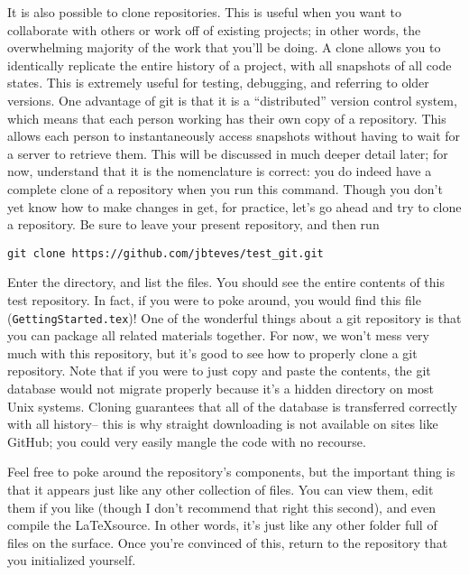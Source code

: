 \par{
It is also possible to clone repositories. This is useful when you want to
collaborate with others or work off of existing projects; in other words, the
overwhelming majority of the work that you'll be doing. A clone allows you to
identically replicate the entire history of a project, with all snapshots of
all code states. This is extremely useful for testing, debugging, and
referring to older versions. One advantage of git is that it is a
``distributed'' version control system, which means that each person working
has their own copy of a repository. This allows each person to instantaneously
access snapshots without having to wait for a server to retrieve them. This
will be discussed in much deeper detail later; for now, understand that it is
the nomenclature is correct: you do indeed have a complete clone of a
repository when you run this command. Though you don't yet know how to make
changes in get, for practice, let's go ahead and try to clone a repository.
Be sure to leave your present repository, and then run
}

\begin{verbatim}
git clone https://github.com/jbteves/test_git.git
\end{verbatim}

\par{
Enter the directory, and list the files. You should see the entire contents of
this test repository. In fact, if you were to poke around, you would find this
file (\verb+GettingStarted.tex+)! 
One of the wonderful things about a git repository is that you can
package all related materials together. For now, we won't mess very much with
this repository, but it's good to see how to properly clone a git repository.
Note that if you were to just copy and paste the contents, the git database
would not migrate properly because it's a hidden directory on most Unix
systems. Cloning guarantees that all of the database is transferred correctly
with all history-- this is why straight downloading is not available on sites
like GitHub; you could very easily mangle the code with no recourse.  
}

\par{
Feel free to poke around the repository's components, but the important thing
is that it appears just like any other collection of files. You can view them,
edit them if you like (though I don't recommend that right this second), and
even compile the \LaTeX source. In other words, it's just like any other
folder full of files on the surface. Once you're convinced of this, return to
the repository that you initialized yourself.
}
